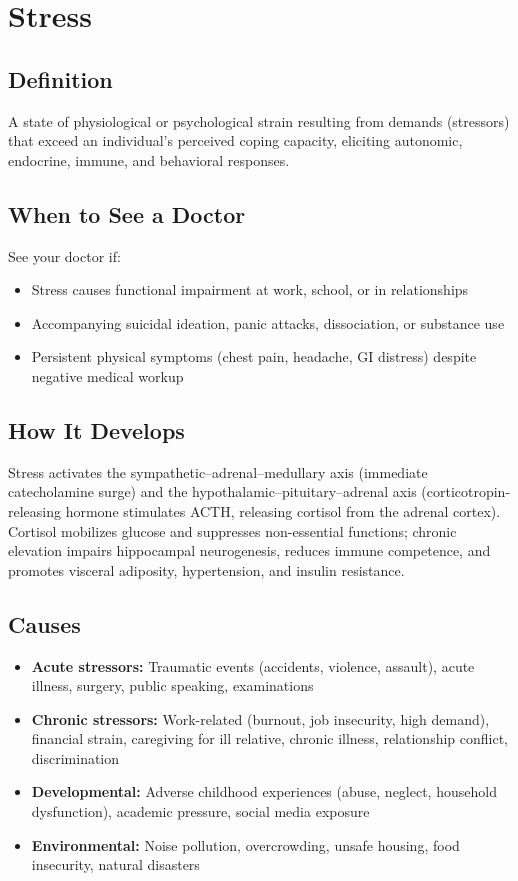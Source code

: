 \chapter{Stress}

\section*{Definition}
A state of physiological or psychological strain resulting from demands (stressors) that exceed an individual's perceived coping capacity, eliciting autonomic, endocrine, immune, and behavioral responses.

\section*{When to See a Doctor}
See your doctor if:
\begin{itemize}
  \item Stress causes functional impairment at work, school, or in relationships
  \item Accompanying suicidal ideation, panic attacks, dissociation, or substance use
  \item Persistent physical symptoms (chest pain, headache, GI distress) despite negative medical workup
\end{itemize}

\section*{How It Develops}
Stress activates the sympathetic--adrenal--medullary axis (immediate catecholamine surge) and the hypothalamic--pituitary--adrenal axis (corticotropin-releasing hormone stimulates ACTH, releasing cortisol from the adrenal cortex). Cortisol mobilizes glucose and suppresses non-essential functions; chronic elevation impairs hippocampal neurogenesis, reduces immune competence, and promotes visceral adiposity, hypertension, and insulin resistance.

\section*{Causes}
\begin{itemize}
  \item \textbf{Acute stressors:} Traumatic events (accidents, violence, assault), acute illness, surgery, public speaking, examinations
  \item \textbf{Chronic stressors:} Work-related (burnout, job insecurity, high demand), financial strain, caregiving for ill relative, chronic illness, relationship conflict, discrimination
  \item \textbf{Developmental:} Adverse childhood experiences (abuse, neglect, household dysfunction), academic pressure, social media exposure
  \item \textbf{Environmental:} Noise pollution, overcrowding, unsafe housing, food insecurity, natural disasters
\end{itemize}

